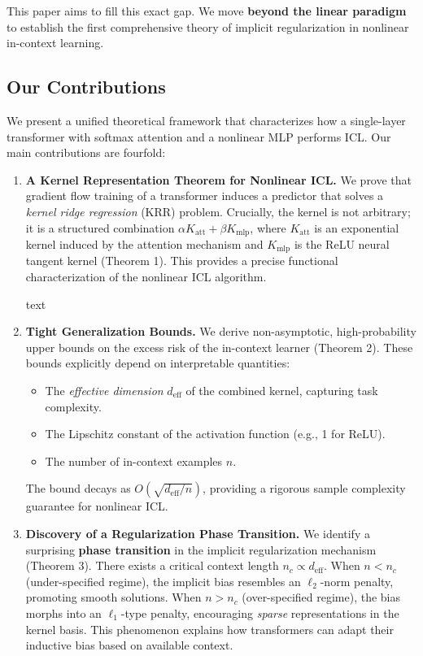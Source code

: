 This paper aims to fill this exact gap. We move \textbf{beyond the linear paradigm} to establish the first comprehensive theory of implicit regularization in nonlinear in-context learning.

\subsection{Our Contributions}
\label{subsec:contributions}

We present a unified theoretical framework that characterizes how a single-layer transformer with softmax attention and a nonlinear MLP performs ICL. Our main contributions are fourfold:

\begin{enumerate}
	\item \textbf{A Kernel Representation Theorem for Nonlinear ICL.} We prove that gradient flow training of a transformer induces a predictor that solves a \textit{kernel ridge regression} (KRR) problem. Crucially, the kernel is not arbitrary; it is a structured combination $\alpha K_{\text{att}} + \beta K_{\text{mlp}}$, where $K_{\text{att}}$ is an exponential kernel induced by the attention mechanism and $K_{\text{mlp}}$ is the ReLU neural tangent kernel (Theorem 1). This provides a precise functional characterization of the nonlinear ICL algorithm.
	
	text
	\item \textbf{Tight Generalization Bounds.} We derive non-asymptotic, high-probability upper bounds on the excess risk of the in-context learner (Theorem 2). These bounds explicitly depend on interpretable quantities:
	\begin{itemize}
		\item The \textit{effective dimension} $d_{\text{eff}}$ of the combined kernel, capturing task complexity.
		\item The Lipschitz constant of the activation function (e.g., 1 for ReLU).
		\item The number of in-context examples $n$.
	\end{itemize}
	The bound decays as $O(\sqrt{d_{\text{eff}}/n})$, providing a rigorous sample complexity guarantee for nonlinear ICL.
	
	\item \textbf{Discovery of a Regularization Phase Transition.} We identify a surprising \textbf{phase transition} in the implicit regularization mechanism (Theorem 3). There exists a critical context length $n_c \propto d_{\text{eff}}$. When $n < n_c$ (under-specified regime), the implicit bias resembles an $\ell_2$-norm penalty, promoting smooth solutions. When $n > n_c$ (over-specified regime), the bias morphs into an $\ell_1$-type penalty, encouraging \textit{sparse} representations in the kernel basis. This phenomenon explains how transformers can adapt their inductive bias based on available context.
	

\end{enumerate}
